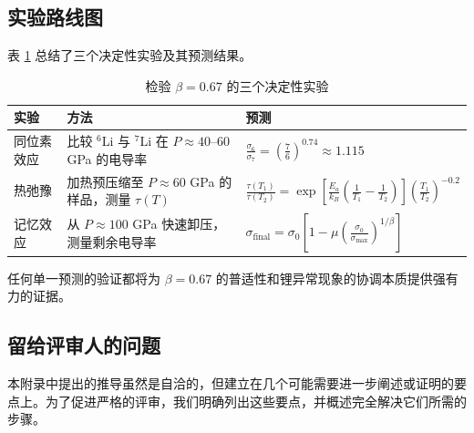 \documentclass[12pt,a4paper]{article}
\theoremstyle{remark}
\begin{document}
	\subsection{实验路线图}
	
	表 \ref{tab:experiments} 总结了三个决定性实验及其预测结果。
	
	\begin{table}[h]
		\centering
		\caption{检验 \(\beta = 0.67\) 的三个决定性实验}
		\label{tab:experiments}
		\begin{tabular}{p{}p{}p{}}
			\toprule
			\textbf{实验} & \textbf{方法} & \textbf{预测} \\
			\midrule
			同位素效应 & 比较 \(^6\)Li 与 \(^7\)Li 在 \(P \approx 40\)–60 GPa 的电导率 & \(\displaystyle \frac{\sigma_6}{\sigma_7} = \left(\frac{7}{6}\right)^{0.74} \approx 1.115\) \\
			\hline
			热弛豫 & 加热预压缩至 \(P \approx 60\) GPa 的样品，测量 \(\tau(T)\) & \(\displaystyle \frac{\tau(T_1)}{\tau(T_2)} = \exp\left[\frac{E_a}{k_B}\left(\frac1{T_1}-\frac1{T_2}\right)\right] \left(\frac{T_1}{T_2}\right)^{-0.2}\) \\
			\hline
			记忆效应 & 从 \(P \approx 100\) GPa 快速卸压，测量剩余电导率 & \(\displaystyle \sigma_{\text{final}} = \sigma_0\left[1 - \mu\left(\frac{\sigma_0}{\sigma_{\max}}\right)^{1/\beta}\right]\) \\
			\bottomrule
		\end{tabular}
	\end{table}
	
	任何单一预测的验证都将为 \(\beta = 0.67\) 的普适性和锂异常现象的协调本质提供强有力的证据。
	
	\subsection{留给评审人的问题}
	\label{subsec:remaining-questions}
	
	本附录中提出的推导虽然是自洽的，但建立在几个可能需要进一步阐述或证明的要点上。为了促进严格的评审，我们明确列出这些要点，并概述完全解决它们所需的步骤。
	
\end{document}
